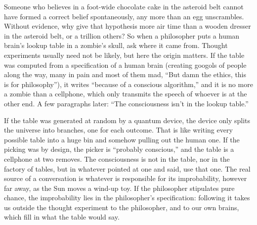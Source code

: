 Someone who believes in a foot-wide chocolate cake in the asteroid belt cannot have formed a correct belief spontaneously, any more than an egg unscrambles. Without evidence, why give that hypothesis more air time than a wooden dresser in the asteroid belt, or a trillion others? So when a philosopher puts a human brain's lookup table in a zombie's skull, ask where it came from. Thought experiments usually need not be likely, but here the origin matters. If the table was computed from a specification of a human brain (creating googols of people along the way, many in pain and most of them mad, ``But damn the ethics, this is for philosophy''), it writes ``because of a conscious algorithm,'' and it is no more a zombie than a cellphone, which only transmits the speech of whoever is at the other end.  A few paragraphs later: ``The consciousness isn't in the lookup table.'' 

If the table was generated at random by a quantum device, the device only splits the universe into branches, one for each outcome.  That is like writing every possible table into a huge bin and somehow pulling out the human one. If the picking was by design, the picker is ``probably conscious,'' and the table is a cellphone at two removes. The consciousness is not in the table, nor in the factory of tables, but in whatever pointed at one and said, use that one. The real source of a conversation is whatever is responsible for its improbability, however far away, as the Sun moves a wind-up toy. If the philosopher stipulates pure chance, the improbability lies in the philosopher's specification: following it takes us outside the thought experiment to the philosopher, and to our own brains, which fill in what the table would say.

